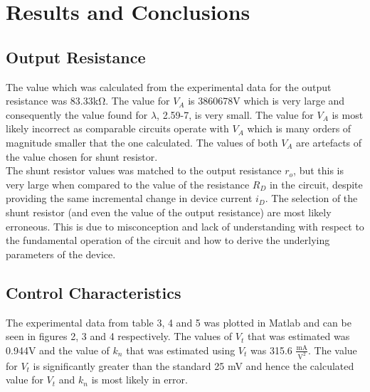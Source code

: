 \documentclass{article}
\begin{document}
\section{Results and Conclusions}

\subsection{Output Resistance}
The value which was calculated from the experimental data for the output resistance was 83.33\si{\kilo \ohm}. The value for $V_A$ is 3860678\si{\volt} which is very large and consequently the value found for $\lambda$, 2.59\mbox{-}7, is very small. The value for $V_A$ is most likely incorrect as comparable circuits operate with $V_A$ which is many orders of magnitude smaller that the one calculated. The values of both $V_A$ are artefacts of the value chosen for shunt resistor.\\

The shunt resistor values was matched to the output resistance $r_o$, but this is very large when compared to the value of the resistance $R_D$ in the circuit, despite providing the same incremental change in device current $i_D$. The selection of the shunt resistor (and even the value of the output resistance) are most likely erroneous. This is due to misconception and lack of understanding with respect to the fundamental operation of the circuit and how to derive the underlying parameters of the device.

\subsection{Control Characteristics}

The experimental data from table 3, 4 and 5 was plotted in Matlab and can be seen in figures 2, 3 and 4 respectively. The values of $V_t$ that was estimated was 0.944\si{\volt} and the value of $k_n$ that was estimated using $V_t$ was 315.6 $\frac{\si{\milli \ampere}}{\si{\volt}^2}$. The value for $V_t$ is significantly greater than the standard 25 \si{\milli \volt} and hence the calculated value for $V_t$ and $k_n$ is most likely in error.
\end{document}
